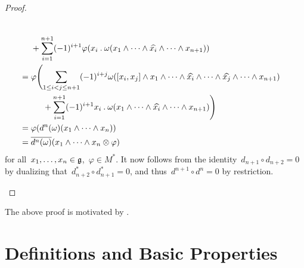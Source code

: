\begin{proof}
\begin{enumerate}
\begin{align*}
        \\
        {}&
        +
        \sum_{i=1}^{n+1}
        (-1)^{i+1}
        \varphi( x_i \mathbin{.} \omega( x_1 \wedge \dotsb \wedge \widehat{x_i} \wedge \dotsb \wedge x_{n+1} ) )
        \\
        ={}&
        \varphi
        \Biggl(
          \sum_{1 \leq i < j \leq n+1}
          (-1)^{i+j}
          \omega( [x_i, x_j] \wedge x_1 \wedge \dotsb \wedge \widehat{x_i} \wedge \dotsb \wedge \widehat{x_j} \wedge \dotsb \wedge x_{n+1} )
        \\
          {}&
          \phantom{
            \varphi\Biggl(
          }
          +
          \sum_{i=1}^{n+1}
          (-1)^{i+1}
          x_i \mathbin{.} \omega( x_1 \wedge \dotsb \wedge \widehat{x_i} \wedge \dotsb \wedge x_{n+1} )
        \Biggr)
        \\
        ={}&
        \varphi( d^n(\omega)(x_1 \wedge \dotsb \wedge x_n) )
        \\
        ={}&
        \overline{ d^n(\omega) } (x_1 \wedge \dotsb \wedge x_n \otimes \varphi)
      \end{align*}
      for all~$x_1, \dotsc, x_n \in \mathfrak{g}$,~$\varphi \in M^*$.
      It now follows from the identity~$d_{n+1} \circ d_{n+2} = 0$ by dualizing that~$d_{n+2}^* \circ d_{n+1}^* = 0$, and thus~$d^{n+1} \circ d^n = 0$ by restriction.
    \qedhere
  \end{enumerate}
\end{proof}


\begin{remark}
  The above proof is motivated by \cite[\S 3.1]{kumar_lie_cohomology}.
\end{remark}





\section{Definitions and Basic Properties}

